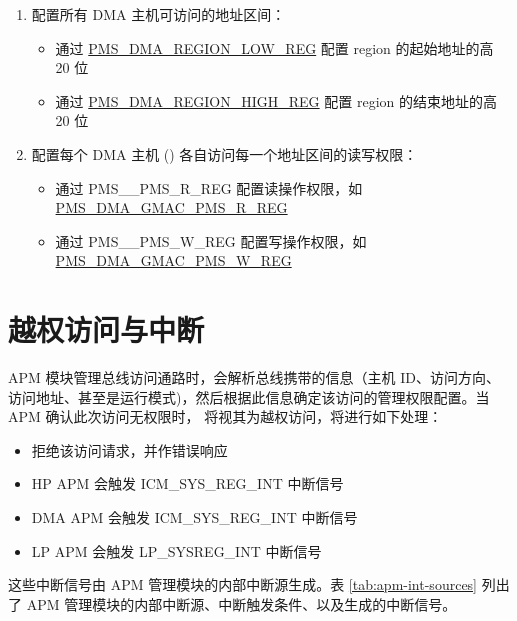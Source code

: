 \documentclass[main\_\_CN.tex]{subfiles}
\begin{document}
\begin{enumerate}
    \item 配置所有 DMA 主机可访问的地址区间：
    \begin{itemize}
        \item 通过 \hyperref[regdesc:PMSDMAREGIONNLOWREG]{PMS\_DMA\_REGION\_LOW\_REG} 配置 region 的起始地址的高 20 位
        \item 通过 \hyperref[regdesc:PMSDMAREGIONNHIGHREG]{PMS\_DMA\_REGION\_HIGH\_REG} 配置 region 的结束地址的高 20 位
    \end{itemize}
    \item 配置每个 DMA 主机 () 各自访问每一个地址区间的读写权限：
    \begin{itemize}
        \item 通过 PMS\_\_PMS\_R\_REG 配置读操作权限，如 \hyperref[regdesc:PMSDMAGMACPMSRREG]{PMS\_DMA\_GMAC\_PMS\_R\_REG}
        \item 通过 PMS\_\_PMS\_W\_REG 配置写操作权限，如 \hyperref[regdesc:PMSDMAGMACPMSWREG]{PMS\_DMA\_GMAC\_PMS\_W\_REG}
    \end{itemize}
\end{enumerate}

\section{越权访问与中断}

APM 模块管理总线访问通路时，会解析总线携带的信息（主机 ID、访问方向、访问地址、甚至是运行模式)，然后根据此信息确定该访问的管理权限配置。当 APM 确认此次访问无权限时，\chipname{} 将视其为越权访问，将进行如下处理：

\begin{itemize}
    \item 拒绝该访问请求，并作错误响应
    \item HP APM  会触发 ICM\_SYS\_REG\_INT 中断信号
    \item DMA APM 会触发 ICM\_SYS\_REG\_INT 中断信号
    \item LP APM  会触发 LP\_SYSREG\_INT 中断信号
\end{itemize}

这些中断信号由 APM 管理模块的内部中断源生成。表 \ref{tab:apm-int-sources} 列出了 APM 管理模块的内部中断源、中断触发条件、以及生成的中断信号。
\end{document}
